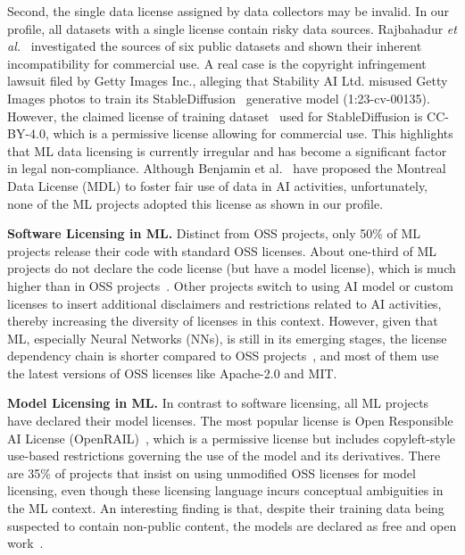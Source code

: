 Second, the single data license assigned by data collectors may be invalid.
In our profile, all datasets with a single license contain risky data sources.
Rajbahadur \textit{et al.}~\cite{rajbahadur2021can} investigated the sources of six public datasets and shown their inherent incompatibility for commercial use.
A real case is the copyright infringement lawsuit filed by Getty Images Inc., alleging that Stability AI Ltd. misused Getty Images photos to train its StableDiffusion~\cite{rombach2022high} generative model (1:23-cv-00135).
However, the claimed license of training dataset~\cite{schuhmann2022laion} used for StableDiffusion is CC-BY-4.0, which is a permissive license allowing for commercial use.
This highlights that ML data licensing is currently irregular and has become a significant factor in legal non-compliance.
Although Benjamin et al.~\cite{benjamin2019towards} have proposed the Montreal Data License (MDL) to foster fair use of data in AI activities, unfortunately, none of the ML projects adopted this license as shown in our profile.

\textbf{Software Licensing in ML.}
Distinct from OSS projects, only 50\% of ML projects release their code with standard OSS licenses.
About one-third of ML projects do not declare the code license (but have a model license), which is much higher than in OSS projects~\cite{cui2023empirical}.
Other projects switch to using AI model or custom licenses to insert additional disclaimers and restrictions related to AI activities, thereby increasing the diversity of licenses in this context.
However, given that ML, especially Neural Networks (NNs), is still in its emerging stages, the license dependency chain is shorter compared to OSS projects~\cite{buchkova2022dasea}, and most of them use the latest versions of OSS licenses like Apache-2.0 and MIT.


\textbf{Model Licensing in ML.}
In contrast to software licensing, all ML projects have declared their model licenses.
The most popular license is Open Responsible AI License (OpenRAIL)~\cite{contractor2022behavioral}, which is a permissive license but includes copyleft-style use-based restrictions governing the use of the model and its derivatives.
There are 35\% of projects that insist on using unmodified OSS licenses for model licensing, even though these licensing language incurs conceptual ambiguities in the ML context.
An interesting finding is that, despite their training data being suspected to contain non-public content, the models are declared as free and open work~\cite{henderson2023foundation}.

